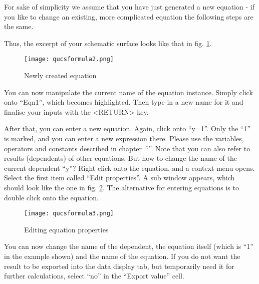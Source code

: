 For sake of simplicity we assume that you have just generated a new
equation - if you like to change an existing, more complicated equation
the following steps are the same.

Thus, the excerpt of your schematic surface looks like that in fig.
\ref{cap:Newly-created-equation}.

%
\begin{figure}[ht]
\begin{center}\texttt{[image: qucsformula2.png]}\end{center}


\caption{\label{cap:Newly-created-equation}Newly created equation}
\end{figure}


You can now manipulate the current name of the equation
instance. Simply click onto {}``Eqn1'', which becomes
highlighted. Then type in a new name for it and finalise your inputs
with the <RETURN> key.

After that, you can enter a new equation. Again, click onto {}``y=1''.
Only the {}``1'' is marked, and you can enter a new expression there.
Please use the variables, operators and constants described in chapter
\textit{``''}.  Note that you can also refer to
results (dependents) of other equations.  But how to change the name
of the current dependent {}``y''?  Right click onto the equation, and
a context menu opens.  Select the first item called {}``Edit
properties''.  A sub window appears, which should look like the one in
fig. \ref{cap:Editing-equation-properties}.  The alternative for
entering equations is to double click onto the equation.

%
\begin{figure}
\begin{center}\texttt{[image: qucsformula3.png]}\end{center}


\caption{\label{cap:Editing-equation-properties}Editing equation properties}
\end{figure}


You can now change the name of the dependent, the equation itself
(which is {}``1'' in the example shown) and the name of the equation.
If you do not want the result to be exported into the data display
tab, but temporarily need it for further calculations, select {}``no''
in the {}``Export value'' cell. 



